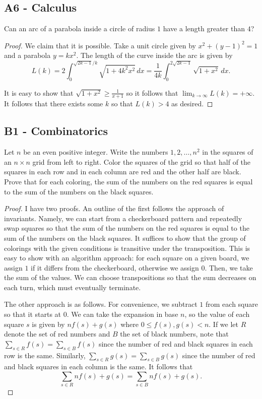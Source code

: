 \documentclass[11pt]{scrartcl}
\newcommand{\<}{\langle}
\renewcommand{\>}{\rangle}
\begin{document}
\subsection{A6 - Calculus}
 Can an arc of a parabola inside a circle of radius $1$ have a length greater than $4$?

\begin{proof}
We claim that it is possible.  Take a unit circle given by $x^2 + (y-1)^2 = 1$ and a parabola $y = kx^2$.  The length of the curve inside the arc is given by 
$$L(k) = 2\int_0^{\sqrt{2k-1}/k} \sqrt{1 + 4k^2 x^2}\,dx = \frac{1}{4k} \int_0^{2\sqrt{2k-1}} \sqrt{1 + x^2} \,dx.$$

It is easy to show that $\sqrt{1 +  x^2} \ge \frac{1}{x+1}$ so it follows that $\lim_{k \to \infty} L(k) = +\infty$.  It follows that there exists some $k$ so that $L(k) > 4$ as desired.  
\end{proof}
\pagebreak
\subsection{B1 - Combinatorics}
 Let $n$ be an even positive integer.  Write the numbers $1, 2, \dots, n^2$ in the squares of an $n \times n$ grid from left to right.  Color the squares of the grid so that half of the squares in each row and in each column are red and the other half are black.  Prove that for each coloring, the sum of the numbers on the red squares is equal to the sum of the numbers on the black squares.  

\begin{proof}
I have two proofs.  An outline of the first follows the approach of invariants.  Namely, we can start from a checkerboard pattern and repeatedly swap squares so that the sum of the numbers on the red squares is equal to the sum of the numbers on the black squares.  It suffices to show that the group of colorings with the given conditions is transitive under the transposition.  This is easy to show with an algorithm approach: for each square on a given board, we assign $1$ if it differs from the checkerboard, otherwise we assign $0$.  Then, we take the sum of the values.  We can choose transpositions so that the sum decreases on each turn, which must eventually terminate.  

The other approach is as follows.  For convenience, we subtract $1$ from each square so that it starts at $0$.  We can take the expansion in base $n$, so the value of each square $s$ is given by $nf(s) + g(s)$ where $0 \le f(s), g(s) < n$.  If we let $R$ denote the set of red numbers and $B$ the set of black numbers, note that $\sum_{s \in R} f(s) = \sum_{s \in B} f(s)$ since the number of red and black squares in each row is the same.  Similarly, $\sum_{s \in R} g(s) = \sum_{s \in B} g(s)$ since the number of red and black squares in each column is the same.  It follows that 
$$\sum_{s \in R} nf(s) + g(s) = \sum_{s \in B} nf(s) + g(s).$$
\end{proof}
\end{document}
